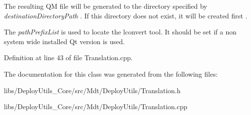 The resulting QM file will be generated to the directory specified by {\itshape destination\+Directory\+Path} . If this directory does not exist, it will be created first .

The {\itshape path\+Prefix\+List} is used to locate the lconvert tool. It should be set if a non system wide installed Qt version is used. 

Definition at line 43 of file Translation.\+cpp.



The documentation for this class was generated from the following files\+:\begin{DoxyCompactItemize}
\item 
libs/\+Deploy\+Utils\+\_\+\+Core/src/\+Mdt/\+Deploy\+Utils/Translation.\+h\item 
libs/\+Deploy\+Utils\+\_\+\+Core/src/\+Mdt/\+Deploy\+Utils/Translation.\+cpp\end{DoxyCompactItemize}
